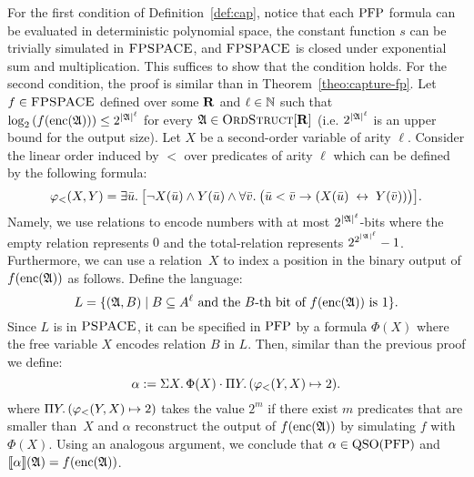 For the first condition of Definition~\ref{def:cap}, notice that each ${\rm PFP}$ formula can be evaluated in deterministic polynomial space, the constant function $s$ can be trivially simulated in $\text{\sc FPSPACE}$, and $\text{\sc FPSPACE}$ is closed under exponential sum and multiplication. This suffices to show that the condition holds.
For the second condition, the proof is similar than in Theorem~\ref{theo:capture-fp}. Let $f\in \text{\sc FPSPACE}$ defined over some $\mathbf{R}$ and $\ell\in\mathbb{N}$ such that $\log_2\left( f({\rm enc}(\mathfrak{A})) \right) \leq 2^{{|\mathfrak{A}|}^\ell}$ for every $\mathfrak{A}\in\text{\sc OrdStruct}[\mathbf{R}]$  (i.e. $2^{{|\mathfrak{A}|}^\ell}$ is an upper bound for the output size). Let $X$ be a second-order variable of arity $\ell$. Consider the linear order induced by $<$ over predicates of arity $\ell$ which can be defined by the following formula:
$$
\varphi_{<}(X,Y) = \exists{\bar{u}}.\:\big[\neg X(\bar{u})\wedge Y(\bar{u})\wedge \forall{\bar{v}}.\:\big(
\bar{u}<\bar{v}\to(X(\bar{u})\;\leftrightarrow\; Y(\bar{v}))\big)\big].
$$
Namely, we use relations to encode numbers with at most $2^{{|\mathfrak{A}|}^\ell}$-bits where the empty relation represents $0$ and the total-relation represents $2^{2^{{|\mathfrak{A}|}^\ell}}-1$.
Furthermore, we can use a relation~$X$ to index a position in the binary output of $f({\rm enc}(\mathfrak{A}))$ as follows.
Define the language:
\[
L = \{(\mathfrak{A},B)\mid B \subseteq A^{\ell}\text{ and the $B$-th bit of $f({\rm enc}(\mathfrak{A}))$ is 1}\}.
\]
Since $L$ is in $\text{\sc PSPACE}$, it can be specified in ${\rm PFP}$ \cite{AbiteboulV89} by a formula $\Phi(X)$ where the free variable $X$ encodes relation $B$ in $L$. Then, similar than the previous proof we define:
$$
\alpha := \Sigma{X}.\, \Phi(X)\cdot  \Pi{Y}.\,(\varphi_{<}(Y,X)\mapsto 2).
$$ 
where $\Pi{Y}.\,(\varphi_{<}(Y,X)\mapsto 2)$ takes the value $2^m$ if there exist $m$ predicates that are smaller than~$X$ and $\alpha$ reconstruct the output of $f({\rm enc}(\mathfrak{A}))$ by simulating $f$ with $\Phi(X)$. Using an analogous argument, we conclude that $\alpha\in{\rm QSO}({\rm PFP})$ and ${\llbracket{}{\alpha}\rrbracket}(\mathfrak{A}) = f({\rm enc}(\mathfrak{A}))$.